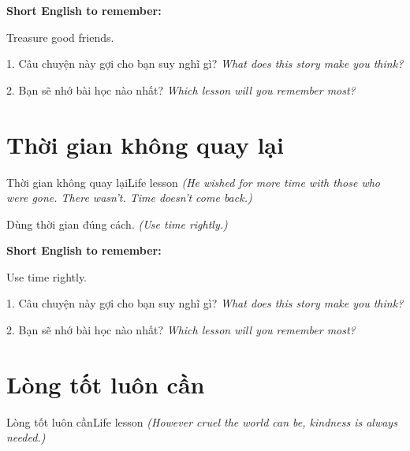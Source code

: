 \begin{ghinhoanh}
\textbf{Short English to remember:}

Treasure good friends.

\end{ghinhoanh}

\begin{tuhocnhanh}
1. Câu chuyện này gợi cho bạn suy nghĩ gì? \textit{What does this story make you think?}

2. Bạn sẽ nhớ bài học nào nhất? \textit{Which lesson will you remember most?}
\end{tuhocnhanh}
\ngancach


\section{Thời gian không quay lại}
\begin{truyen}{Thời gian không quay lại}{Life lesson}
\textit{(He wished for more time with those who were gone. There wasn't. Time doesn't come back.)}
\end{truyen}

\begin{baihoc}
Dùng thời gian đúng cách.
\textit{(Use time rightly.)}
\end{baihoc}

\begin{ghinhoanh}
\textbf{Short English to remember:}

Use time rightly.

\end{ghinhoanh}

\begin{tuhocnhanh}
1. Câu chuyện này gợi cho bạn suy nghĩ gì? \textit{What does this story make you think?}

2. Bạn sẽ nhớ bài học nào nhất? \textit{Which lesson will you remember most?}
\end{tuhocnhanh}
\ngancach


\section{Lòng tốt luôn cần}
\begin{truyen}{Lòng tốt luôn cần}{Life lesson}
\textit{(However cruel the world can be, kindness is always needed.)}
\end{truyen}

